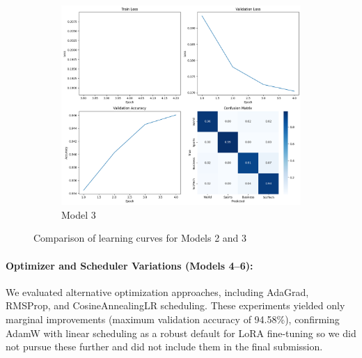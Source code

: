 \documentclass[letterpaper]{article}
\begin{document}
\begin{figure}[h]
\begin{subfigure}[b]{0.15\textwidth}
    \end{subfigure}
    \hfill
    \begin{subfigure}[b]{0.15\textwidth}
        \centering
        \includegraphics[width=\linewidth]{images/model_3.png}
        \caption{Model 3}
        \label{fig:model3}
    \end{subfigure}
    \caption{Comparison of learning curves for Models 2 and 3}
    \label{fig:rank-exp}
\end{figure}
\paragraph{Optimizer and Scheduler Variations (Models 4--6):} We evaluated alternative optimization approaches, including AdaGrad, RMSProp, and CosineAnnealingLR scheduling. These experiments yielded only marginal improvements (maximum validation accuracy of 94.58\%), confirming AdamW with linear scheduling as a robust default for LoRA fine-tuning so we did not pursue these further and did not include them in the final submission.
\end{document}

